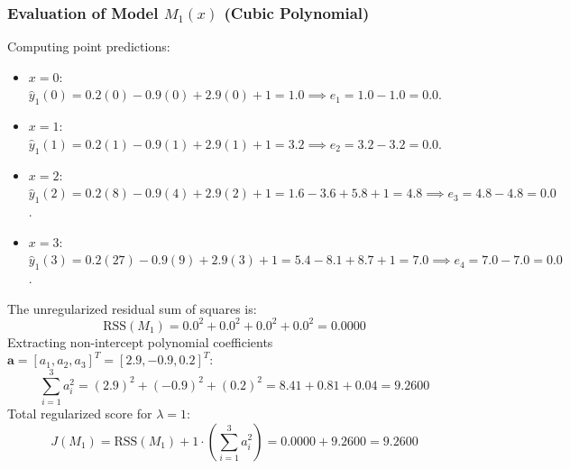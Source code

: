 \documentclass[11pt,a4paper]{article}
\theoremstyle{definition}
\theoremstyle{plain}
\theoremstyle{remark}
\begin{document}
\subsubsection{Evaluation of Model \texorpdfstring{$M_1(x)$}{M1(x)} (Cubic Polynomial)}
Computing point predictions:
\begin{itemize}[noitemsep]
    \item $x=0$: $\hat{y}_1(0) = 0.2(0) - 0.9(0) + 2.9(0) + 1 = 1.0 \implies e_1 = 1.0 - 1.0 = 0.0$.
    \item $x=1$: $\hat{y}_1(1) = 0.2(1) - 0.9(1) + 2.9(1) + 1 = 3.2 \implies e_2 = 3.2 - 3.2 = 0.0$.
    \item $x=2$: $\hat{y}_1(2) = 0.2(8) - 0.9(4) + 2.9(2) + 1 = 1.6 - 3.6 + 5.8 + 1 = 4.8 \implies e_3 = 4.8 - 4.8 = 0.0$.
    \item $x=3$: $\hat{y}_1(3) = 0.2(27) - 0.9(9) + 2.9(3) + 1 = 5.4 - 8.1 + 8.7 + 1 = 7.0 \implies e_4 = 7.0 - 7.0 = 0.0$.
\end{itemize}
The unregularized residual sum of squares is:
\begin{equation}
\text{RSS}(M_1) = 0.0^2 + 0.0^2 + 0.0^2 + 0.0^2 = \mathbf{0.0000}
\end{equation}
Extracting non-intercept polynomial coefficients $\mathbf{a} = [a_1, a_2, a_3]^T = [2.9, -0.9, 0.2]^T$:
\begin{equation}
\sum_{i=1}^3 a_i^2 = (2.9)^2 + (-0.9)^2 + (0.2)^2 = 8.41 + 0.81 + 0.04 = \mathbf{9.2600}
\end{equation}
Total regularized score for $\lambda = 1$:
\begin{equation}
J(M_1) = \text{RSS}(M_1) + 1 \cdot \left(\sum_{i=1}^3 a_i^2\right) = 0.0000 + 9.2600 = \mathbf{9.2600}
\end{equation}
\end{document}
